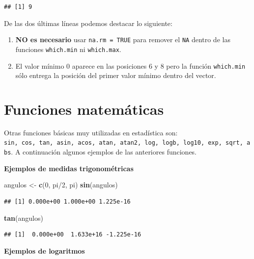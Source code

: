 \documentclass[10pt,]{krantz}
\makeatletter
\newenvironment{Shaded}{\begin{snugshade}}{\end{snugshade}}
\newcommand{\KeywordTok}[1]{\textcolor[rgb]{0.13,0.29,0.53}{\textbf{{#1}}}}
\newcommand{\DecValTok}[1]{\textcolor[rgb]{0.00,0.00,0.81}{{#1}}}
\newcommand{\StringTok}[1]{\textcolor[rgb]{0.31,0.60,0.02}{{#1}}}
\newcommand{\NormalTok}[1]{{#1}}
\providecommand{\tightlist}{%
  \setlength{\itemsep}{0pt}\setlength{\parskip}{0pt}}
\newenvironment{kframe}{%
\medskip{}
\setlength{\fboxsep}{.8em}
 \def\at@end@of@kframe{}%
 \ifinner\ifhmode%
  \def\at@end@of@kframe{\end{minipage}}%
  \begin{minipage}{\columnwidth}%
 \fi\fi%
 \def\FrameCommand##1{\hskip\@totalleftmargin \hskip-\fboxsep
 \colorbox{shadecolor}{##1}\hskip-\fboxsep
     \hskip-\linewidth \hskip-\@totalleftmargin \hskip\columnwidth}%
 \MakeFramed {\advance\hsize-\width
   \@totalleftmargin\z@ \linewidth\hsize
   \@setminipage}}%
 {\par\unskip\endMakeFramed%
 \at@end@of@kframe}
\renewenvironment{Shaded}{\begin{kframe}}{\end{kframe}}
\makeatother
\begin{document}
\begin{verbatim}
## [1] 9
\end{verbatim}

De las dos últimas líneas podemos destacar lo siguiente:

\begin{enumerate}
\def\labelenumi{\arabic{enumi}.}
\tightlist
\item
  \textbf{NO es necesario} usar \texttt{na.rm\ =\ TRUE} para remover el
  \texttt{NA} dentro de las funciones \texttt{which.min} ni
  \texttt{which.max}.
\item
  El valor mínimo 0 aparece en las posiciones 6 y 8 pero la función
  \texttt{which.min} sólo entrega la posición del primer valor mínimo
  dentro del vector.
\end{enumerate}

\section{Funciones matemáticas}\label{funciones-matematicas}

Otras funciones básicas muy utilizadas en estadística son:
\texttt{sin,\ cos,\ tan,\ asin,\ acos,\ atan,\ atan2,\ log,\ logb,\ log10,\ exp,\ sqrt,\ abs}.
A continuación algunos ejemplos de las anteriores funciones.

\textbf{Ejemplos de medidas trigonométricas}

\begin{Shaded}
\begin{Highlighting}[]
\NormalTok{angulos <-}\StringTok{ }\KeywordTok{c}\NormalTok{(}\DecValTok{0}\NormalTok{, pi/}\DecValTok{2}\NormalTok{, pi)}
\KeywordTok{sin}\NormalTok{(angulos)}
\end{Highlighting}
\end{Shaded}

\begin{verbatim}
## [1] 0.000e+00 1.000e+00 1.225e-16
\end{verbatim}

\begin{Shaded}
\begin{Highlighting}[]
\KeywordTok{tan}\NormalTok{(angulos)}
\end{Highlighting}
\end{Shaded}

\begin{verbatim}
## [1]  0.000e+00  1.633e+16 -1.225e-16
\end{verbatim}

\textbf{Ejemplos de logaritmos}
\end{document}
